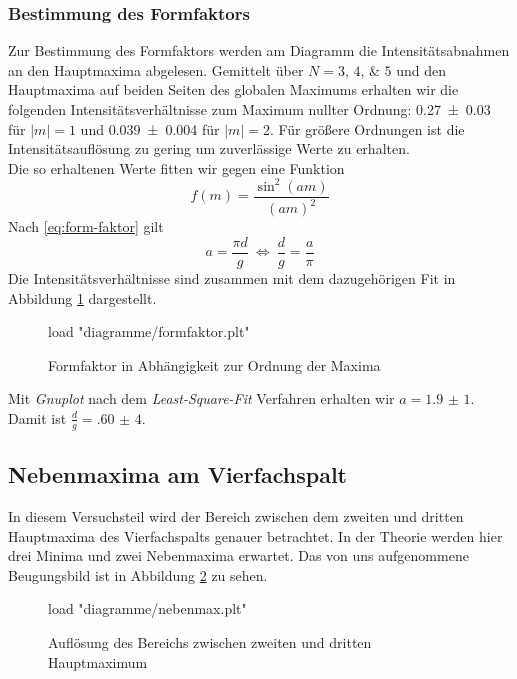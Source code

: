 \subsubsection{Bestimmung des Formfaktors}
Zur Bestimmung des Formfaktors werden am Diagramm die Intensitätsabnahmen an den Hauptmaxima abgelesen. Gemittelt über $ N = \numlist{3;4;5} $ und den Hauptmaxima auf beiden Seiten des globalen Maximums erhalten wir die folgenden Intensitätsverhältnisse zum Maximum nullter Ordnung: \num{0,27+-0,03} für $ |m| = 1 $ und \num{0,039+-0,004} für $ |m| = 2 $. Für größere Ordnungen ist die Intensitätsauflösung zu gering um zuverlässige Werte zu erhalten. \\
Die so erhaltenen Werte fitten wir gegen eine Funktion
\begin{equation}
	f(m) = \frac{\sin^2(am)}{(am)^2}
\end{equation}
Nach \eqref{eq:form-faktor} gilt
\begin{equation}
	a = \frac{\pi d}{g} ~\Leftrightarrow~ \frac{d}{g} = \frac{a}{\pi}
\end{equation}
Die Intensitätsverhältnisse sind zusammen mit dem dazugehörigen Fit in Abbildung \ref{fig:form-faktor} dargestellt.
\begin{figure}[H]
	\centering
	\begin{gnuplot}[terminal=pdf, terminaloptions=color]
		load "diagramme/formfaktor.plt"
	\end{gnuplot}
	\caption{Formfaktor in Abhängigkeit zur Ordnung der Maxima}
	\label{fig:form-faktor}
\end{figure}
Mit \textit{Gnuplot} nach dem \textit{Least-Square-Fit} Verfahren erhalten wir $ a = \num{1,9(1)} $. Damit ist $ \frac{d}{g} = \num{,60(4)} $.

\subsection{Nebenmaxima am Vierfachspalt}
In diesem Versuchsteil wird der Bereich zwischen dem zweiten und dritten Hauptmaxima des Vierfachspalts genauer betrachtet. In der Theorie werden hier drei Minima und zwei Nebenmaxima erwartet. Das von uns aufgenommene Beugungsbild ist in Abbildung \ref{fig:neben} zu sehen.
\begin{figure}[H]
	\centering
	\begin{gnuplot}[terminal=pdf, terminaloptions=color]
		load "diagramme/nebenmax.plt"
	\end{gnuplot}
	\caption{Auflösung des Bereichs zwischen zweiten und dritten Hauptmaximum}
	\label{fig:neben}
\end{figure}

